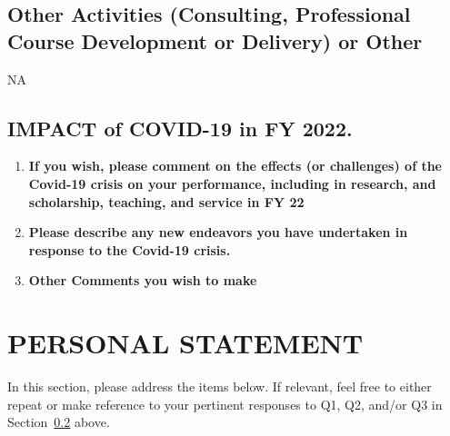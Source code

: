 \documentclass[11pt]{article}
\newcommand{\fy}{2022}
\begin{document}
\subsection{Other Activities (Consulting, Professional Course Development or Delivery) or Other}
NA


\newpage
\subsection{IMPACT of COVID-19 in FY \fy{}.}\label{sec:covid}

\begin{enumerate}
\item
  \textbf{If you wish, please comment on the effects (or
  challenges) of the Covid-19 crisis on your performance, including in
  research, and scholarship, teaching, and service in FY 22}
\item
  \textbf{Please describe any new endeavors you have undertaken
  in response to the Covid-19 crisis.}
\item
  \textbf{Other Comments you wish to make}
\end{enumerate}


\newpage
\section{PERSONAL STATEMENT}

In this section, please address the items below. If relevant, feel free
to either repeat or make reference to your pertinent responses to Q1,
Q2, and/or Q3 in Section~\ref{sec:covid} above.
\end{document}
